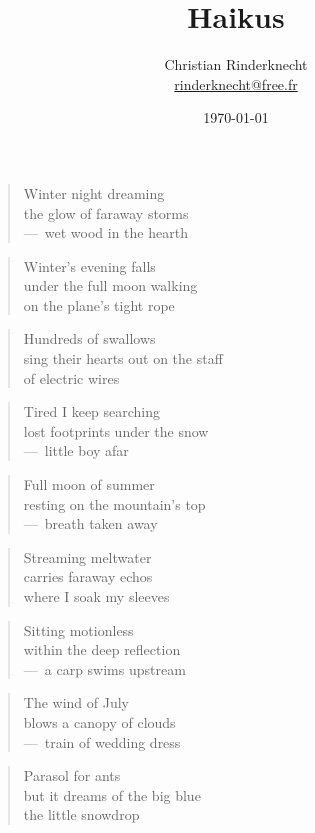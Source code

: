 \documentclass[a4paper,12pt]{article}
\title{Haikus}
\author{Christian Rinderknecht\\
{\small \url{rinderknecht@free.fr}}}
\date{\today}
\begin{document}
\begin{verse}
  Winter night dreaming \\
  the glow of faraway storms \\
  ---~wet wood in the hearth
\end{verse}

\begin{verse}
  Winter's evening falls \\
  under the full moon walking \\
  on the plane's tight rope
\end{verse}

\begin{verse}
  Hundreds of swallows \\
  sing their hearts out on the staff \\
  of electric wires
\end{verse}

\begin{verse}
  Tired I keep searching \\
  lost footprints under the snow \\
  ---~little boy afar
\end{verse}

\begin{verse}
  Full moon of summer \\
  resting on the mountain's top \\
  ---~breath taken away
\end{verse}

\begin{verse}
  Streaming meltwater \\
  carries faraway echos \\
  where I soak my sleeves
\end{verse}

\begin{verse}
  Sitting motionless \\
  within the deep reflection \\
  ---~a carp swims upstream
\end{verse}

\begin{verse}
  The wind of July \\
  blows a canopy of clouds \\
  ---~train of wedding dress
\end{verse}

\begin{verse}
  Parasol for ants \\
  but it dreams of the big blue \\
  the little snowdrop
\end{verse}
\end{document}
